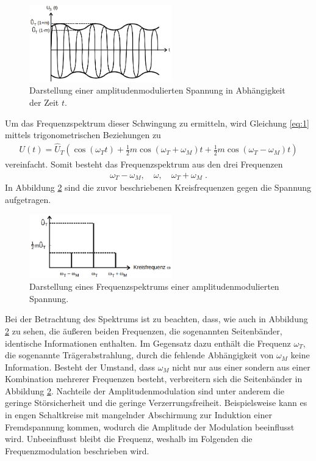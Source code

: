 \begin{figure}
    \centering
    \includegraphics[width=0.55\textwidth]{ressources/T1.png}
    \caption{Darstellung einer amplitudenmodulierten Spannung in Abhängigkeit der Zeit $t$\cite{skript}.}
    \label{fig_T1}
\end{figure}

Um das Frequenzspektrum dieser Schwingung zu ermitteln, wird Gleichung \eqref{eq:1} mittels trigonometrischen Beziehungen zu
\begin{align}
	U(t)=\hat{U}_T\left(\cos{(\omega_Tt)+\frac{1}{2}m\cos{(\omega_T+\omega_M)t}}+\frac{1}{2}m\cos{(\omega_T-\omega_M)t}\right)
\end{align}
vereinfacht. Somit besteht das Frequenzspektrum aus den drei Frequenzen
\begin{align}
	\omega_T-\omega_M,\quad\omega,\quad\omega_T+\omega_M\;.
\end{align}
In Abbildung \ref{fig_T2} sind die zuvor beschriebenen Kreisfrequenzen gegen die Spannung aufgetragen.

\begin{figure}
    \centering
    \includegraphics[width=0.55\textwidth]{ressources/T2.png}
    \caption{Darstellung eines Frequenzspektrums einer amplitudenmodulierten Spannung\cite{skript}.}
    \label{fig_T2}
\end{figure}

Bei der Betrachtung des Spektrums ist zu beachten, dass, wie auch in Abbildung \ref{fig_T2} zu sehen, die äußeren beiden Frequenzen, die sogenannten Seitenbänder, identische Informationen enthalten. Im Gegensatz dazu enthält die Frequenz $\omega_T$, die sogenannte Trägerabstrahlung, durch die fehlende Abhängigkeit von $\omega_M$ keine Information. Besteht der Umstand, dass $\omega_M$ nicht nur aus einer sondern aus einer Kombination mehrerer Frequenzen besteht, verbreitern sich die Seitenbänder in Abbildung \ref{fig_T2}. Nachteile der Amplitudenmodulation sind unter anderem die geringe Störsicherheit und die geringe Verzerrungsfreiheit. Beispielsweise kann es in engen Schaltkreise mit mangelnder Abschirmung zur Induktion einer Fremdspannung kommen, wodurch die Amplitude der Modulation beeinflusst wird. Unbeeinflusst bleibt die Frequenz, weshalb im Folgenden die Frequenzmodulation beschrieben wird.

